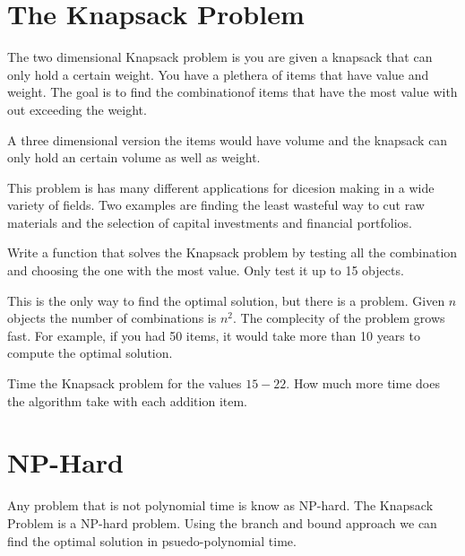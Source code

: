\label{Ch:Knapsack}


\section*{The Knapsack Problem}


The two dimensional Knapsack problem is you are given a knapsack that can only hold a certain weight. You have a plethera of items that have value and weight. The goal is to find the combinationof items that have the most value with out exceeding the weight.

A three dimensional version the items would have volume and the knapsack can only hold an certain volume as well as weight. 

This problem is has many different applications for dicesion making in a wide variety of fields. Two examples are finding the least wasteful way to cut raw materials and the selection of capital investments and financial portfolios.

\begin{problem}
Write a function that solves the Knapsack problem by testing all the combination and choosing the one with the most value. Only test it up to 15 objects.
\end{problem}

This is the only way to find the optimal solution, but there is a problem. Given $n$ objects the number of combinations is $n^2$. The complecity of the problem grows fast. For example, if you had 50 items, it would take more than 10 years to compute the optimal solution.

\begin{problem}
Time the Knapsack problem for the values $15-22$. How much more time does the algorithm take with each addition item.
\end{problem}

\section*{NP-Hard}

Any problem that is not polynomial time is know as NP-hard. The Knapsack Problem is a NP-hard problem. Using the branch and bound approach we can find the optimal solution in psuedo-polynomial time.

